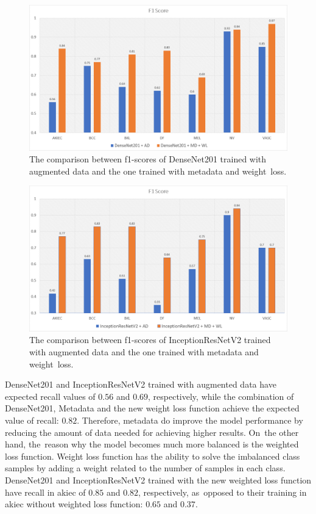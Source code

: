 \documentclass[sensors,article,accept,pdftex,moreauthors]{Definitions/mdpi}
\begin{document}
\begin{figure}[H]
	\centering
	\includegraphics[width=1\linewidth]{Definitions/den f1}
	\caption{The comparison between f1-scores of DenseNet201 trained with augmented data and the one trained with metadata and weight~loss.}
	\label{fig:den f1}
\end{figure}
\unskip
\begin{figure}[H]
	\centering
	\includegraphics[width=1\linewidth]{Definitions/in f1}
	\caption{The comparison between f1-scores of InceptionResNetV2 trained with augmented data and the one trained with metadata and weight~loss.}
	\label{fig:incep f1}
\end{figure}

 DenseNet201 and InceptionResNetV2 trained with augmented data have expected recall values of $0.56$ and $0.69$, respectively, while the combination of DenseNet201, Metadata and the new weight loss function achieve the expected value of recall: $0.82$. Therefore, metadata do improve the model performance by reducing the amount of data needed for achieving higher results. On~the other hand, the~reason why the model becomes much more balanced is the weighted loss function. Weight loss function has the ability to solve the imbalanced class samples by adding a weight related to the number of samples in each class. DenseNet201 and InceptionResNetV2 trained with the new weighted loss function have recall in akiec of $0.85$ and $0.82$, respectively, as~opposed to their training in akiec without weighted loss function: $0.65$ and $0.37$. 
\end{document}
